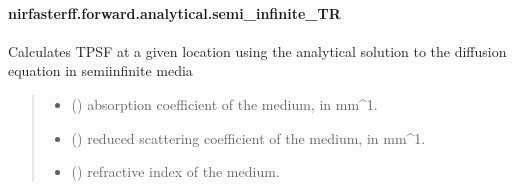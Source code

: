 \documentclass[letterpaper,10pt,english]{sphinxmanual}
\begin{document}
\sphinxstepscope


\paragraph{nirfasterff.forward.analytical.semi\_infinite\_TR}
\label{\detokenize{_autosummary/nirfasterff.forward.analytical.semi_infinite_TR:nirfasterff-forward-analytical-semi-infinite-tr}}\label{\detokenize{_autosummary/nirfasterff.forward.analytical.semi_infinite_TR::doc}}

\begin{fulllineitems}
\label{\detokenize{_autosummary/nirfasterff.forward.analytical.semi_infinite_TR:nirfasterff.forward.analytical.semi_infinite_TR}}
\pysigstartsignatures
\pysiglinewithargsret
{}
{\sphinxparamcomma {}\sphinxparamcomma {}\sphinxparamcomma {}\sphinxparamcomma {}\sphinxparamcomma {}\sphinxparamcomma {}\sphinxparamcomma {}}
{}
\pysigstopsignatures
\sphinxAtStartPar
Calculates TPSF at a given location using the analytical solution to the diffusion equation in semi\sphinxhyphen{}infinite media
\begin{quote}\begin{description}
\begin{itemize}
\item {} 
\sphinxAtStartPar
{} () \textendash{} absorption coefficient of the medium, in mm\textasciicircum{}\sphinxhyphen{}1.

\item {} 
\sphinxAtStartPar
{} () \textendash{} reduced scattering coefficient of the medium, in mm\textasciicircum{}\sphinxhyphen{}1.

\item {} 
\sphinxAtStartPar
{} () \textendash{} refractive index of the medium.


\end{itemize}
\end{description}
\end{quote}
\end{fulllineitems}
\end{document}
